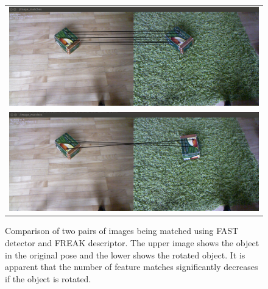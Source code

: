 \begin{figure}
\centering
    \begin{tabular}{c}
 

\includegraphics[width=0.7\columnwidth]{figures/freak-no-rotation.png}\\
\includegraphics[width=0.7\columnwidth]{figures/freak-rotation.png}\\
    \end{tabular}


\caption[Comparison of two pairs of images being matched using FAST detector and FREAK descriptor.]{Comparison of two pairs of images being matched using FAST detector and FREAK descriptor. The upper image shows the object in the original pose and the lower shows the rotated object. It is apparent that the number of feature matches significantly decreases if the object is rotated. }
\label{fig:freak-features}
\end{figure}

 





